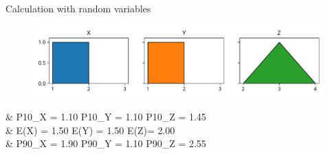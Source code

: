 \documentclass[12pt, aspectratio=149]{beamer}
\theoremstyle{plain}
\begin{document}
\begin{frame}[fragile]{Calculation with random variables}
    \begin{center}
     \begin{figure}
     	\centering
     	\includegraphics[width=0.99\linewidth]{figures/add_uniform}
     \end{figure}
     \end{center}
	 \begin{flalign*}
     	&\hspace*{1em} P10_X = 1.10 \hspace*{4em} P10_Y = 1.10 \hspace*{4em}  P10_Z = 1.45 \\
	 	&\hspace*{1em} E(X) = 1.50 \hspace*{4em}  E(Y) = 1.50 \hspace*{4em}   E(Z)= 2.00 \\
     	&\hspace*{1em} P90_X = 1.90 \hspace*{4em} P90_Y = 1.10 \hspace*{4em}  P90_Z = 2.55 \\
	\end{flalign*}
\end{frame}
\end{document}
